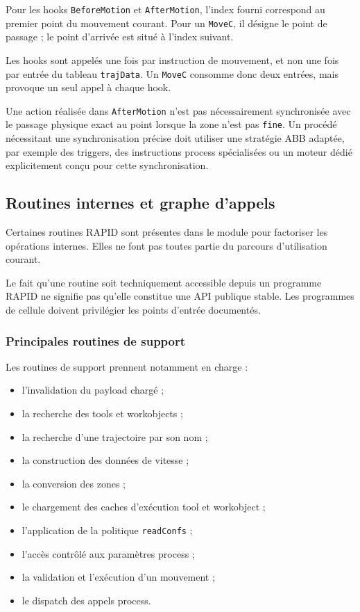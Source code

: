 \documentclass{rapportENSAM}
\begin{document}
Pour les hooks \texttt{BeforeMotion} et \texttt{AfterMotion}, l'index fourni
correspond au premier point du mouvement courant. Pour un \texttt{MoveC}, il
désigne le point de passage ; le point d'arrivée est situé à l'index suivant.

Les hooks sont appelés une fois par instruction de mouvement, et non une fois
par entrée du tableau \texttt{trajData}. Un \texttt{MoveC} consomme donc deux
entrées, mais provoque un seul appel à chaque hook.

Une action réalisée dans \texttt{AfterMotion} n'est pas nécessairement
synchronisée avec le passage physique exact au point lorsque la zone n'est pas
\texttt{fine}. Un procédé nécessitant une synchronisation précise doit
utiliser une stratégie ABB adaptée, par exemple des triggers, des instructions
process spécialisées ou un moteur dédié explicitement conçu pour cette
synchronisation.


\subsection{Routines internes et graphe d'appels}
\label{subsec:rapid-internal-routines}

Certaines routines RAPID sont présentes dans le module pour factoriser les
opérations internes. Elles ne font pas toutes partie du parcours d'utilisation
courant.

Le fait qu'une routine soit techniquement accessible depuis un programme RAPID
ne signifie pas qu'elle constitue une API publique stable. Les programmes de
cellule doivent privilégier les points d'entrée documentés.


\subsubsection{Principales routines de support}
\label{subsubsec:rapid-support-routines}

Les routines de support prennent notamment en charge :

\begin{itemize}
    \item l'invalidation du payload chargé ;
    \item la recherche des tools et workobjects ;
    \item la recherche d'une trajectoire par son nom ;
    \item la construction des données de vitesse ;
    \item la conversion des zones ;
    \item le chargement des caches d'exécution tool et workobject ;
    \item l'application de la politique \texttt{readConfs} ;
    \item l'accès contrôlé aux paramètres process ;
    \item la validation et l'exécution d'un mouvement ;
    \item le dispatch des appels process.
\end{itemize}
\end{document}
